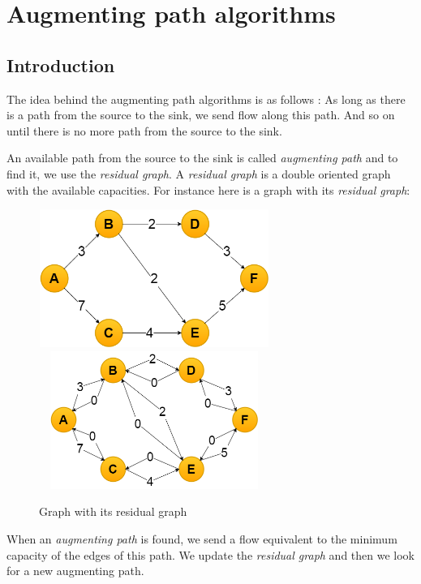 \section{Augmenting path algorithms}
\subsection{Introduction}
The idea behind the augmenting path algorithms is as follows : 
As long as there is a path from the source to the sink, we send flow along this path. And so on until there is no more path from the source to the sink. \newline

An available path from the source to the sink is called \textit{augmenting path} and to find it, we use the \textit{residual graph}. A \textit{residual graph} is a double oriented graph with the available capacities. For instance here is a graph with its \textit{residual graph}: \newline

\begin{figure}[!h]
\includegraphics[width=7.5cm,height=4.5cm]{images/graph.png}\hfill
\includegraphics[width=7.5cm,height=4.5cm]{images/residualgraph.png}
\caption{Graph with its residual graph}
\end{figure}


When an \textit{augmenting path} is found, we send a flow equivalent to the minimum capacity of the edges of this path. We update the \textit{residual graph} and then we look for a new augmenting path. \newline


